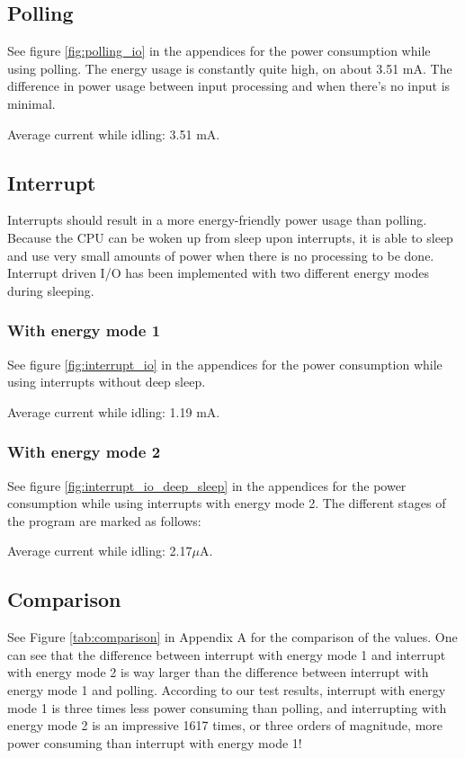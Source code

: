 \subsection{Polling}

See figure \ref{fig:polling_io} in the appendices for the power consumption while using polling. The energy usage is constantly quite high, on about 3.51 mA. The difference in power usage between input processing and when there's no input is minimal.

Average current while idling: 3.51 mA.

\subsection{Interrupt}

Interrupts should result in a more energy-friendly power usage than polling.
Because the CPU can be woken up from sleep upon interrupts, it is able to sleep and use very small amounts of power when there is no processing to be done. Interrupt driven I/O has been implemented with two different energy modes during sleeping.

\subsubsection{With energy mode 1}

See figure \ref{fig:interrupt_io} in the appendices for the power consumption while using interrupts without deep sleep.

Average current while idling: 1.19 mA.

\subsubsection{With energy mode 2}

See figure \ref{fig:interrupt_io_deep_sleep} in the appendices for the power consumption while using interrupts with energy mode 2. The different stages of the program are marked as follows:

Average current while idling: 2.17$\mu$A.

\subsection{Comparison}

See Figure \ref{tab:comparison} in Appendix A for the comparison of the values. One can see that the difference between interrupt with energy mode 1 and interrupt with energy mode 2 is way larger than the difference between interrupt with energy mode 1 and polling. According to our test results, interrupt with energy mode 1 is three times less power consuming than polling, and interrupting with energy mode 2 is an impressive 1617 times, or three orders of magnitude, more power consuming than interrupt with energy mode 1!
